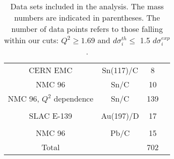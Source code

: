 \begin{table}
\begin{tabular}{c c c c}
 CERN EMC & Sn(117)/C & 8 & \cite{Ashman:1992kv}\\
 NMC 96 & Sn/C & 10 & \cite{Arneodo:1996rv}\\
 NMC 96, $Q^2$ dependence  & Sn/C & 139 & \cite{Arneodo:1996ru}\\
\\
  SLAC E-139 & Au(197)/D & 17 & \cite{PhysRevD.49.4348}\\
\\
 NMC 96 & Pb/C & 15 & \cite{Arneodo:1996rv}\\
\hline
 Total & & 702 & \\
\hline
\hline
\end{tabular}
\caption{Data sets included in the analysis. The mass numbers are indicated in parentheses. The number of data points refers to those falling within our cuts: $Q^2 \ge 1.69$ and $d\sigma^{th}_i \le$ 1.5 $d\sigma^{exp}_i$.}
\label{dataset}
\end{table}

